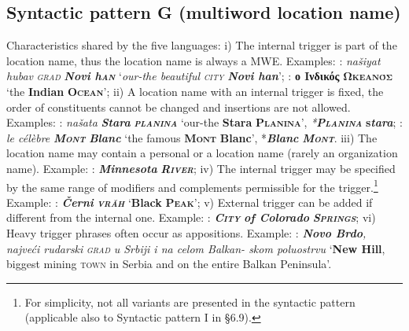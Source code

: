 \documentclass[output=paper]{langsci/langscibook}
\newcommand{\trigger}[1]{\textsc{#1}}
\begin{document}
\subsection{Syntactic pattern G (multiword location name)}

Characteristics shared by the five languages: i) The internal trigger is
part of the location name, thus the location name is always a MWE.
Examples: : \textit{našiyat hubav }\textit{\trigger{grad}}
\textbf{\textit{Novi h}}\textbf{\textit{\trigger{an}}} ‘\textit{our-the
beautiful }\textit{\trigger{city}} \textbf{\textit{Novi han}}’; :
\textbf{ο Ινδικός} \textbf{\trigger{Ωκεανός}} ‘the
\textbf{Indian }\textbf{\trigger{Ocean}}’; ii) A location name with an
internal trigger is fixed, the order of constituents cannot be changed
and insertions are not allowed. Examples: : \textit{našata
}\textbf{\textit{Stara }}\textbf{\textit{\trigger{planina}}} ‘our-the
\textbf{Stara }\textbf{\trigger{Planina}}’,
\textit{*}\textbf{\textit{\trigger{Planina}}}
\textbf{s}\textbf{\textit{tara}}; : \textit{le célèbre
}\textbf{\textit{\trigger{Mont}}} \textbf{\textit{Blanc}} ‘the famous
\textbf{\trigger{Mont}} \textbf{Blanc}’, *\textbf{\textit{Blanc
}}\textbf{\textit{\trigger{Mont}}}. iii) The location name may contain a
personal or a location name (rarely an organization name). Example: :
\textbf{\textit{Minnesota }}\textbf{\textit{\trigger{River}}}; iv) The
internal trigger may be specified by the same range of modifiers and
complements permissible for the
trigger.\footnote{For simplicity, not all variants are  presented in
the syntactic pattern (applicable also to Syntactic
pattern I in §6.9).} Example: : \textbf{\textit{Černi
}}\textbf{\textit{\trigger{vrăh}}} ‘\textbf{Black
}\textbf{\trigger{Peak}}’; v) External trigger can be added if different
from the internal one. Example: : \textbf{\textit{\trigger{City}}}
\textbf{\textit{of Colorado }}\textbf{\textit{\trigger{Springs}}}; vi)
Heavy trigger phrases often occur as appositions. Example: :
\textbf{\textit{Novo Brdo}}\textit{, najveći rudarski
}\textit{\trigger{grad}} \textit{u Srbiji i na celom Balkan- skom
poluostrvu} ‘\textbf{New Hill}, biggest mining \trigger{town} in Serbia
and on the entire Balkan Peninsula’.
\end{document}
